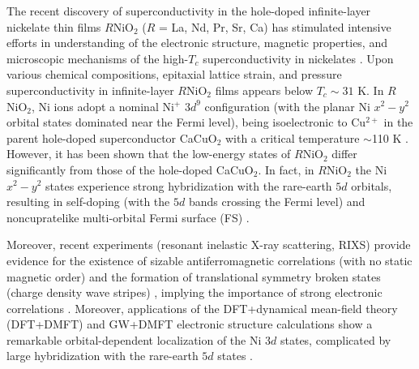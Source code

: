 \documentclass[prl,twocolumn,preprintnumbers,superscriptaddress]{revtex4-1}
\begin{document}
The recent discovery of superconductivity in the hole-doped infinite-layer nickelate thin films $R$NiO$_2$ ($R$ = La, Nd, Pr, Sr, Ca) \cite{Li_2019,Hepting_2020,Zeng_2020,Osada_2021,Lu_2021,Goodge_2021,Ren_2021,Wang_2021,Pan_2022,Zeng_2022} has stimulated intensive efforts in understanding of the electronic structure, magnetic properties, and microscopic mechanisms of the high-$T_c$ superconductivity in nickelates \cite{Kitatani_2020,Chen_2022a,Nomura_2022,Botana_2022,Gu_2022}. 
Upon various chemical compositions, epitaxial lattice strain, and pressure superconductivity in infinite-layer $R$NiO$_2$ films appears below $T_c \sim 31$ K. In $R$NiO$_2$, Ni ions adopt a nominal 
Ni$^+$ $3d^9$ configuration (with the planar Ni $x^2-y^2$ orbital states dominated near the Fermi level), being isoelectronic to Cu$^{2+}$ in the parent hole-doped superconductor CaCuO$_2$ with a 
critical temperature $\sim$110 K \cite{Azuma_1992,Peng_2017,Savrasov_1996}. However, it has been shown that the low-energy states of $R$NiO$_2$ differ significantly from those of the hole-doped CaCuO$_2$. In fact, in $R$NiO$_2$ the Ni $x^2-y^2$ states experience 
strong hybridization with the rare-earth $5d$ orbitals, resulting in self-doping (with the $5d$ bands crossing the Fermi level) and noncupratelike multi-orbital Fermi surface (FS) \cite{Anisimov_1999,Lee_2004,Botana_2020,Werner_2020,Lechermann_2020a,
Karp_2020a,Karp_2020b,Lechermann_2020b,Wang_2020,Nomura_2020,Si_2020,
Leonov_2020,Ryee_2020,Lechermann_2021,Wan_2021,Leonov_2021,Lechermann_2022,
Malyi_2022,Kutepov_2021,Kreisel_2022}. 

Moreover, recent experiments (resonant 
inelastic X-ray scattering, RIXS) provide evidence for the existence of sizable antiferromagnetic correlations (with no static magnetic order) \cite{Lin_2021,Zhou_2022,Lin_2022} and the formation of translational 
symmetry broken states (charge density wave stripes) \cite{Rossi_2021,Tam_2021,Krieger_2021,Ren_2023,Raji_2023}, implying the importance of strong electronic correlations \cite{Mott_1990,Imada_1998}. Moreover, applications of the DFT+dynamical mean-field theory (DFT+DMFT) \cite{Georges_1996,Kotliar_2006} and GW+DMFT \cite{Sun_2002, Biermann_2003} electronic structure calculations show a remarkable orbital-dependent localization of the Ni $3d$ states, complicated by large hybridization with the rare-earth $5d$ states \cite{Werner_2020,Lechermann_2020a,Karp_2020a,Karp_2020b,Lechermann_2020b,
Wang_2020,Nomura_2020,Si_2020,Leonov_2020,Ryee_2020,Lechermann_2021,Wan_2021,
Leonov_2021,Lechermann_2022,Malyi_2022,Kutepov_2021,Kreisel_2022}.  
\end{document}
